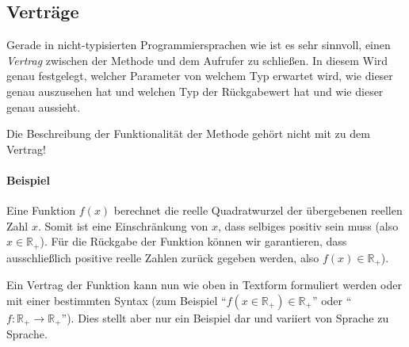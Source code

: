 

\subsection{Verträge} \functionalMark \imperativeMark \oopMark

	Gerade in nicht-typisierten Programmiersprachen wie \racket ist es sehr sinnvoll, einen \textit{Vertrag} zwischen der Methode und dem Aufrufer zu schließen. In diesem Wird genau festgelegt, welcher Parameter von welchem Typ erwartet wird, wie dieser genau auszusehen hat und welchen Typ der Rückgabewert hat und wie dieser genau aussieht.
	
	Die Beschreibung der Funktionalität der Methode gehört nicht mit zu dem Vertrag!
	
	\paragraph{Beispiel}
		Eine Funktion \(f(x)\) berechnet die reelle Quadratwurzel der übergebenen reellen Zahl \(x\). Somit ist eine Einschränkung von \(x\), dass selbiges positiv sein muss (also \(x \in \mathbb{R} _ +\)). Für die Rückgabe der Funktion können wir garantieren, dass ausschließlich positive reelle Zahlen zurück gegeben werden, also \(f(x) \in \mathbb{R} _ +\)).
		
		Ein Vertrag der Funktion kann nun wie oben in Textform formuliert werden oder mit einer bestimmten Syntax (zum Beispiel \enquote{\( f(x \in \mathbb{R} _ +) \in \mathbb{R} _ + \)} oder \enquote{\( f : \mathbb{R} _ + \rightarrow \mathbb{R} _ + \)}). Dies stellt aber nur ein Beispiel dar und variiert von Sprache zu Sprache.
